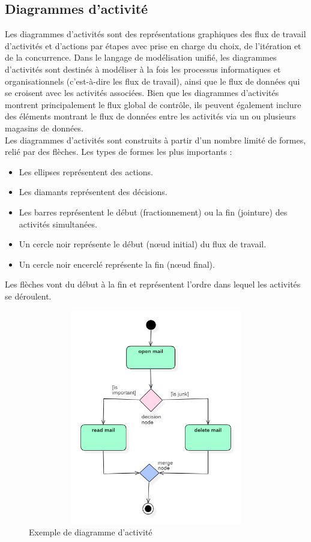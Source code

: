\documentclass[12pt]{report}
\begin{document}
\newpage

\subsection{Diagrammes d'activité}

Les diagrammes d'activités sont des représentations graphiques des flux de travail d'activités et d'actions
par étapes avec prise en charge du choix, de l'itération et de la concurrence.
Dans le langage de modélisation unifié, les diagrammes d'activités sont destinés à modéliser
à la fois les processus informatiques et organisationnels (c'est-à-dire les flux de travail),
ainsi que le flux de données qui se croisent avec les activités associées. Bien que les
diagrammes d'activités montrent principalement le flux global de contrôle, ils peuvent
également inclure des éléments montrant le flux de données entre les activités via un ou
plusieurs magasins de données.
\\
Les diagrammes d'activités sont construits à partir d'un nombre limité de formes, relié par des flèches. Les types de formes les plus importants :
\begin{itemize}
    \item Les ellipses représentent des actions.
    \item Les diamants représentent des décisions.
    \item Les barres représentent le début (fractionnement) ou la fin (jointure) des activités simultanées.
    \item Un cercle noir représente le début (nœud initial) du flux de travail.
    \item Un cercle noir encerclé représente la fin (nœud final).
\end{itemize}
Les flèches vont du début à la fin et représentent l'ordre dans lequel les activités se déroulent.

\begin{figure}[h]
\centering
    \centerline{\includegraphics[width = 4.5in, height = 3.7in]{../Images/DiagActEX.png}}
    \caption{Exemple de diagramme d'activité}
\end{figure}
\end{document}
